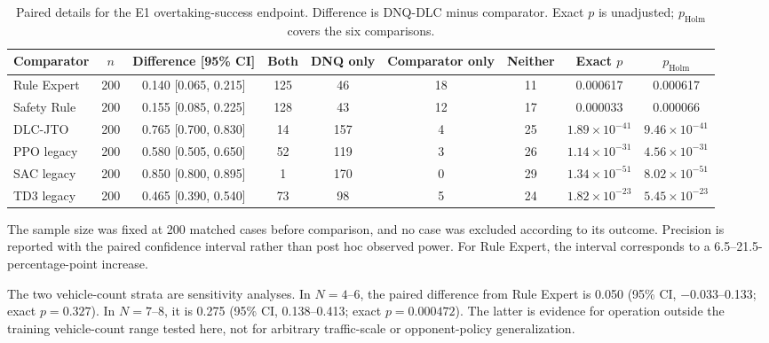 \documentclass[journal]{IEEEtran}
\begin{document}
\begin{table}[t]
\centering
\caption{Paired details for the E1 overtaking-success endpoint. Difference is DNQ-DLC minus comparator. Exact $p$ is unadjusted; $p_{\mathrm{Holm}}$ covers the six comparisons.}
\label{tab:supp_primary_paired}
\begin{tabular}{lcccccccc}
\toprule
Comparator & $n$ & Difference [95\% CI] & Both & DNQ only & Comparator only & Neither & Exact $p$ & $p_{\mathrm{Holm}}$ \\
\midrule
Rule Expert & 200 & 0.140 [0.065, 0.215] & 125 & 46 & 18 & 11 & 0.000617 & 0.000617 \\
Safety Rule & 200 & 0.155 [0.085, 0.225] & 128 & 43 & 12 & 17 & 0.000033 & 0.000066 \\
DLC-JTO & 200 & 0.765 [0.700, 0.830] & 14 & 157 & 4 & 25 & $1.89\times10^{-41}$ & $9.46\times10^{-41}$ \\
PPO legacy & 200 & 0.580 [0.505, 0.650] & 52 & 119 & 3 & 26 & $1.14\times10^{-31}$ & $4.56\times10^{-31}$ \\
SAC legacy & 200 & 0.850 [0.800, 0.895] & 1 & 170 & 0 & 29 & $1.34\times10^{-51}$ & $8.02\times10^{-51}$ \\
TD3 legacy & 200 & 0.465 [0.390, 0.540] & 73 & 98 & 5 & 24 & $1.82\times10^{-23}$ & $5.45\times10^{-23}$ \\
\bottomrule
\end{tabular}
\end{table}

The sample size was fixed at 200 matched cases before comparison, and no
case was excluded according to its outcome. Precision is reported with
the paired confidence interval rather than post hoc observed power. For
Rule Expert, the interval corresponds to a 6.5--21.5-percentage-point
increase.

The two vehicle-count strata are sensitivity analyses. In $N=4$--6,
the paired difference from Rule Expert is 0.050 (95\% CI,
$-0.033$--0.133; exact $p=0.327$). In $N=7$--8, it is 0.275 (95\% CI,
0.138--0.413; exact $p=0.000472$). The latter is evidence for operation
outside the training vehicle-count range tested here, not for arbitrary
traffic-scale or opponent-policy generalization.
\end{document}
